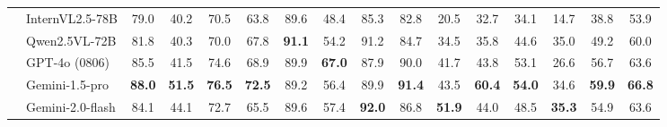 \begin{table*}[!t]
{\begin{tabular}{@{}llcccccccccccccc@{}}
 & InternVL2.5-78B & 79.0 & 40.2 & 70.5 & 63.8 & 89.6 & 48.4 & 85.3 & 82.8 & 20.5 & 32.7 & 34.1 & 14.7 & 38.8 & 53.9 \\
 & Qwen2.5VL-72B & 81.8 & 40.3 & 70.0 & 67.8 & \textbf{91.1} & 54.2 & 91.2 & 84.7 & 34.5 & 35.8 & 44.6 & 35.0 & 49.2 & 60.0 \\
 & GPT-4o (0806) & 85.5 & 41.5 & 74.6 & 68.9 & 89.9 & \textbf{67.0} & 87.9 & 90.0 & 41.7 & 43.8 & 53.1 & 26.6 & 56.7 & 63.6 \\
 & Gemini-1.5-pro & \textbf{88.0} & \textbf{51.5} & \textbf{76.5} & \textbf{72.5} & 89.2 & 56.4 & 89.9 & \textbf{91.4} & 43.5 & \textbf{60.4} & \textbf{54.0} & 34.6 & \textbf{59.9} & \textbf{66.8} \\
 & Gemini-2.0-flash & 84.1 & 44.1 & 72.7 & 65.5 & 89.6 & 57.4 & \textbf{92.0} & 86.8 & \textbf{51.9} & 44.0 & 48.5 & \textbf{35.3} & 54.9 & 63.6 \\ \bottomrule 
\end{tabular}%
}
\end{table*}

